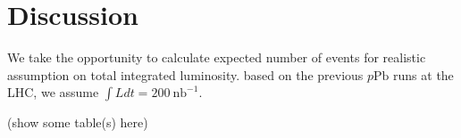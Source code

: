 \section{Discussion}

We take the opportunity to calculate expected number of events for realistic assumption on total integrated luminosity.
based on the previous $p\textrm{Pb}$ runs at the LHC, we assume  $\int Ldt= 200~\textrm{nb}^{-1}$.

(show some table(s) here)
